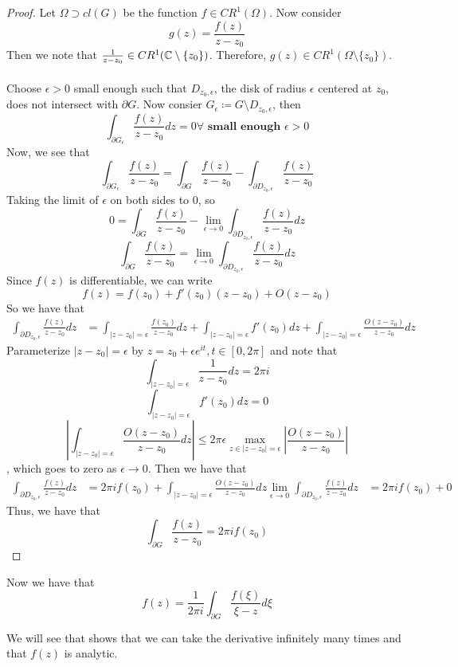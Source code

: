 \begin{proof}
Let $\Omega \supset cl(G)$ be the function $f \in CR^1(\Omega)$. Now consider
\[g(z) = \frac{f(z)}{z - z_0}\]
Then we note that $\frac{1}{z - z_0} \in CR^1(\mathbb{C} \setminus \{z_0\})$. Therefore, $g(z) \in CR^1(\Omega \setminus \{z_0\})$.\\\\
Choose $\epsilon > 0$ small enough such that $D_{z_0, \epsilon}$, the disk of radius $\epsilon$ centered at $z_0$, does not intersect with $\partial G$. Now consier $G_\epsilon \coloneqq G \setminus D_{z_0, \epsilon}$, then
\[\int_{\partial G_\epsilon} \frac{f(z)}{z - z_0} dz = 0 \forall \textbf{ small enough } \epsilon > 0\]
Now, we see that
\[\int_{\partial G_\epsilon} \frac{f(z)}{z - z_0} = \int_{\partial G} \frac{f(z)}{z - z_0} - \int_{\partial D_{z_0, \epsilon}} \frac{f(z)}{z - z_0}\]
Taking the limit of $\epsilon$ on both sides to $0$, so
\[0 = \int_{\partial G} \frac{f(z)}{z - z_0} - \lim_{\epsilon \to 0} \int_{\partial D_{z_0, \epsilon}}\frac{f(z)}{z - z_0} dz \]
\[\int_{\partial G} \frac{f(z)}{z - z_0} = \lim_{\epsilon \to 0} \int_{\partial D_{z_0, \epsilon}}\frac{f(z)}{z - z_0} dz\]
Since $f(z)$ is differentiable, we can write
\[f(z) = f(z_0) + f'(z_0) (z - z_0) + O(z - z_0)\]
So we have that
\begin{align*}
  \int_{\partial D_{z_0, \epsilon}}\frac{f(z)}{z - z_0} dz
  &= \int_{ |z - z_0| = \epsilon} \frac{f(z_0)}{z - z_0} dz + \int_{ |z - z_0| = \epsilon} f'(z_0) dz + \int_{ |z - z_0| = \epsilon} \frac{O(z - z_0)}{z - z_0} dz
\end{align*}
Parameterize $|z - z_0| = \epsilon$ by $z = z_0 + \epsilon e^{it}, t \in [0, 2\pi]$ and note that
\[\int_{|z - z_0| = \epsilon} \frac{1}{z - z_0} dz = 2 \pi i\]
\[\int_{ |z - z_0| = \epsilon} f'(z_0) dz = 0\]
\[|\int_{ |z - z_0| = \epsilon} \frac{O(z - z_0)}{z - z_0} dz| \leq 2 \pi \epsilon \max_{z \in |z - z_0| = \epsilon} |\frac{O(z - z_0)}{z - z_0}|\]
, which goes to zero as $\epsilon \to 0$. Then we have that
\begin{align*}
  \int_{\partial D_{z_0, \epsilon}}\frac{f(z)}{z - z_0} dz
  &= 2\pi i f(z_0) + \int_{ |z - z_0| = \epsilon} \frac{O(z - z_0)}{z - z_0} dz
  \lim_{\epsilon \to 0} \int_{\partial D_{z_0, \epsilon}}\frac{f(z)}{z - z_0} dz &= 2\pi i f(z_0) + 0
\end{align*}
Thus, we have that
\[\int_{\partial G} \frac{f(z)}{z - z_0} = 2\pi i f(z_0)\]
\end{proof}

Now we have that
\[f(z) = \frac{1}{2\pi i} \int_{\partial G} \frac{f(\xi)}{\xi - z} d\xi\]

We will see that shows that we can take the derivative infinitely many times and that $f(z)$ is analytic.